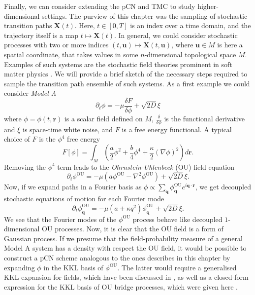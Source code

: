 \documentclass[]{cam-thesis}
\begin{document}
Finally, we can consider extending the pCN and TMC to study higher-dimensional settings. The purview of this chapter was the sampling of stochastic transition paths $\mathbf{X}(t)$. Here, $t \in [0, T]$ is an index over a time domain, and the trajectory itself is a map $t \mapsto \mathbf{X}(t)$. In general, we could consider stochastic processes with two or more indices $(t, \mathbf{u}) \mapsto \mathbf{X}(t, \mathbf{u})$, where $\mathbf{u} \in M$ is here a spatial coordinate, that takes values in some $n$-dimensional topological space $M$. Examples of such systems are the stochastic field theories prominent in soft matter physics   \citep{catesTheoriesBinaryFluid2018, tiribocchiActiveModelScalar2015, stenhammarContinuumTheoryPhase2013, wittkowskiScalarF4Field2014, deanLangevinEquationDensity1996}. We will provide a brief sketch of the necessary steps required to sample the transition path ensemble of such systems. As a first example we could consider \textit{Model A} \citep{catesActiveFieldTheories2019}
\begin{equation}
	\partial_t \phi = - \mu \frac{\delta F}{\delta \phi} + \sqrt{2 D} \xi 
\end{equation}
where $\phi = \phi(t, \mathbf{r})$ is a scalar field defined on $M$, $\frac{\delta}{\delta \phi}$ is the functional derivative and $\xi$ is space-time white noise, and $F$ is a free energy functional. A typical choice of $F$ is the $\phi^4$ free energy
\begin{equation}
	F[\phi] = \int_M \left( \frac{a}{2} \phi^2 + \frac{b}{4} \phi^4 + \frac{\kappa}{2} (\nabla \phi)^2 \right) d \mathbf{r}.
\end{equation}
Removing the $\phi^4$ term leads to the \textit{Ohrnstein-Uhlenbeck} (OU) \citep{gardinerHandbookStochasticMethods1990} field equation
\begin{equation} \label{eq:OU process field}
	\partial_t \phi^\text{OU} = - \mu (a \phi^\text{OU} - \nabla^2 \phi^\text{OU}) + \sqrt{2D} \xi.
\end{equation}
Now, if we expand paths in a Fourier basis as $\phi \propto \sum_\mathbf{q} \phi^\text{OU}_\mathbf{q} e^{i \mathbf{q} \cdot \mathbf{r}}$, we get decoupled stochastic equations of motion for each Fourier mode
\begin{equation}
	\partial_t \phi^\text{OU}_\mathbf{q} = - \mu (a + \kappa q^2) \phi^\text{OU}_\mathbf{q} + \sqrt{2D} \xi.
\end{equation}
We see that the Fourier modes of the $\phi^\text{OU}$ process behave like decoupled $1$-dimensional OU processes. Now, it is clear that the OU field is a form of Gaussian process. If we presume that the field-probability measure of a general Model A system has a density with respect the OU field, it would be possible to construct a pCN scheme analogous to the ones describes in this chapter by expanding $\phi$ in the KKL basis of $\phi^\text{OU}$. The latter would require a generalised KKL expansion for fields, which have been discussed in \citep{wangKarhunenLoeveExpansionsTheir2008}, as well as a closed-form expression for the KKL basis of OU bridge processes, which were given here \citep{corlayPropertiesOrnsteinUhlenbeckBridge2014a}.
\end{document}
